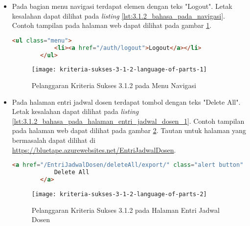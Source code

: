 \begin{itemize}
    \item Pada bagian menu navigasi terdapat elemen dengan teks "Logout". Letak kesalahan dapat dilihat pada \textit{listing} \ref{lst:3.1.2_bahasa_pada_navigasi}. Contoh tampilan pada halaman web dapat dilihat pada gambar \ref{fig:3.1.2_language_of_parts_1}. 
    \begin{lstlisting}[frame=single, label={lst:3.1.2_bahasa_pada_navigasi}, language=HTML, caption=Pelanggaran Kriteria Sukses 3.1.2 pada Menu Navigasi]
        <ul class="menu">
            <li><a href="/auth/logout">Logout</a></li>
        </ul>
    \end{lstlisting}
    
    \begin{figure}[H]
        \centering  
        \texttt{[image: kriteria-sukses-3-1-2-language-of-parts-1]}  
        \caption[Pelanggaran Kriteria Sukses 3.1.2 pada Menu Navigasi]{Pelanggaran Kriteria Sukses 3.1.2 pada Menu Navigasi}
        \label{fig:3.1.2_language_of_parts_1}  
    \end{figure}

    \item Pada halaman entri jadwal dosen terdapat tombol dengan teks "Delete All". Letak kesalahan dapat dilihat pada \textit{listing} \ref{lst:3.1.2_bahasa_pada_halaman_entri_jadwal_dosen_1}. Contoh tampilan pada halaman web dapat dilihat pada gambar \ref{fig:3.1.2_language_of_parts_2}. Tautan untuk halaman yang bermasalah dapat dilihat di \url{https://bluetape.azurewebsites.net/EntriJadwalDosen}.
    \begin{lstlisting}[frame=single, label={lst:3.1.2_bahasa_pada_halaman_entri_jadwal_dosen_1}, language=HTML, caption=Pelanggaran Kriteria Sukses 3.1.2 pada Halaman Entri Jadwal Dosen]
        <a href="/EntriJadwalDosen/deleteAll/export/" class="alert button" onClick="return konfirmasi();">
            Delete All
        </a>
    \end{lstlisting}
    
    \begin{figure}[H]
        \centering  
        \texttt{[image: kriteria-sukses-3-1-2-language-of-parts-2]}  
        \caption[Pelanggaran Kriteria Sukses 3.1.2 pada Halaman Entri Jadwal Dosen]{Pelanggaran Kriteria Sukses 3.1.2 pada Halaman Entri Jadwal Dosen}
        \label{fig:3.1.2_language_of_parts_2}  
    \end{figure}
    

\end{itemize}

